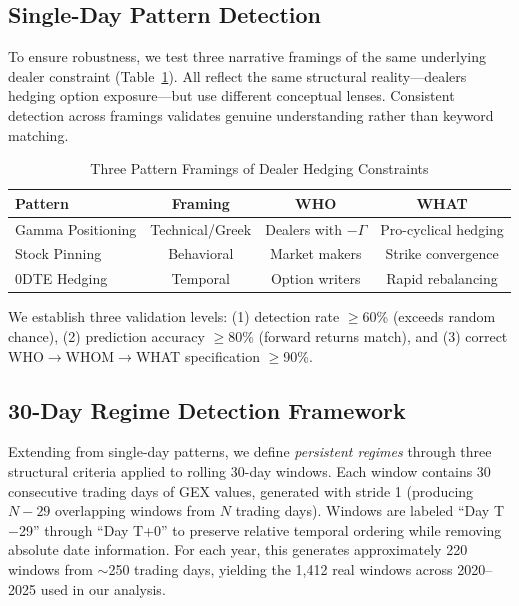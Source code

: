 \subsection{Single-Day Pattern Detection}
\label{subsec:single_day_method}

To ensure robustness, we test three narrative framings of the same underlying dealer constraint (Table~\ref{tab:patterns}). All reflect the same structural reality---dealers hedging option exposure---but use different conceptual lenses. Consistent detection across framings validates genuine understanding rather than keyword matching.

\begin{table}[!htbp]
\centering
\caption{Three Pattern Framings of Dealer Hedging Constraints}
\label{tab:patterns}
\small
\begin{tabular}{@{}lccc@{}}
\toprule
\textbf{Pattern} & \textbf{Framing} & \textbf{WHO} & \textbf{WHAT} \\
\midrule
Gamma Positioning & Technical/Greek & Dealers with $-\Gamma$ & Pro-cyclical hedging \\
Stock Pinning & Behavioral & Market makers & Strike convergence \\
0DTE Hedging & Temporal & Option writers & Rapid rebalancing \\
\bottomrule
\end{tabular}
\end{table}

We establish three validation levels: (1) detection rate $\geq$60\% (exceeds random chance), (2) prediction accuracy $\geq$80\% (forward returns match), and (3) correct WHO$\rightarrow$WHOM$\rightarrow$WHAT specification $\geq$90\%.

\subsection{30-Day Regime Detection Framework}

Extending from single-day patterns, we define \textit{persistent regimes} through three structural criteria applied to rolling 30-day windows. Each window contains 30 consecutive trading days of GEX values, generated with stride 1 (producing $N - 29$ overlapping windows from $N$ trading days). Windows are labeled ``Day T$-$29'' through ``Day T+0'' to preserve relative temporal ordering while removing absolute date information. For each year, this generates approximately 220 windows from $\sim$250 trading days, yielding the 1,412 real windows across 2020--2025 used in our analysis.

